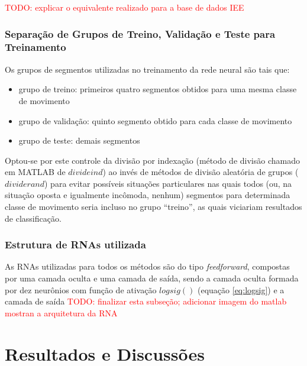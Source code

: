 \textcolor{red}{TODO: explicar o equivalente realizado para a base de dados IEE}

			\subsection{Separação de Grupos de Treino, Validação e Teste para Treinamento}
Os grupos de segmentos utilizadas no treinamento da rede neural são tais que:

\begin{itemize}
\item grupo de treino: primeiros quatro segmentos obtidos para uma mesma classe de movimento
\item grupo de validação: quinto segmento obtido para cada classe de movimento
\item grupo de teste: demais segmentos
\end{itemize}

Optou-se por este controle da divisão por indexação (método de divisão chamado em MATLAB de $divideind$) ao invés de métodos de divisão aleatória de grupos ($dividerand$) para evitar possíveis situações particulares nas quais todos (ou, na situação oposta e igualmente incômoda, nenhum) segmentos para determinada classe de movimento seria incluso no grupo ``treino'', as quais viciariam resultados de classificação.

			\subsection{Estrutura de RNAs utilizada}
As RNAs utilizadas para todos os métodos são do tipo \emph{feedforward}, compostas por uma camada oculta e uma camada de saída, sendo a camada oculta formada por dez neurônios com função de ativação $logsig()$ (equação \ref{eq:logsig}) e a camada de saída
\textcolor{red}{TODO: finalizar esta subseção; adicionar imagem do matlab mostran a arquitetura da RNA}


	\chapter{Resultados e Discussões}
